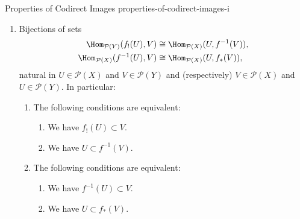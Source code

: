 \begin{proposition}{Properties of Codirect Images \rmI}{properties-of-codirect-images-i}
\begin{enumerate}
\begin{enumerate}
\begin{itemize}
                        \item For each $U\in\mathcal{P}(X)$, we have $f^{-1}(f_{*}(U))\subset U$.
                        \item For each $V\in\mathcal{P}(Y)$, we have $f_{!}(f^{-1}(V))\subset V$.
                        \item For each $V\in\mathcal{P}(Y)$, we have $V\subset f_{*}(f^{-1}(V))$.
                    \end{itemize}
                \item\label{properties-of-codirect-images-i-triple-adjointness-2}Bijections of sets
                    \begin{align*}
                        \Hom_{\mathcal{P}(Y)}(f_{!}(U),V)  &\cong \Hom_{\mathcal{P}(X)}(U,f^{-1}(V)),\\
                        \Hom_{\mathcal{P}(X)}(f^{-1}(U),V) &\cong \Hom_{\mathcal{P}(X)}(U,f_{*}(V)),
                    \end{align*}
                    natural in $U\in\mathcal{P}(X)$ and $V\in\mathcal{P}(Y)$ and (respectively) $V\in\mathcal{P}(X)$ and $U\in\mathcal{P}(Y)$. In particular:
                    \begin{enumerate}
                        \item\label{properties-of-codirect-images-i-triple-adjointness-2-a}The following conditions are equivalent:
                            \begin{enumerate}
                                \item\label{properties-of-codirect-images-i-triple-adjointness-2-a-i}We have $f_{!}(U)\subset V$.
                                \item\label{properties-of-codirect-images-i-triple-adjointness-2-a-ii}We have $U\subset f^{-1}(V)$.
                            \end{enumerate}
                        \item\label{properties-of-codirect-images-i-triple-adjointness-2-b}The following conditions are equivalent:
                            \begin{enumerate}
                                \item\label{properties-of-codirect-images-i-triple-adjointness-2-b-i}We have $f^{-1}(U)\subset V$.
                                \item\label{properties-of-codirect-images-i-triple-adjointness-2-b-ii}We have $U\subset f_{*}(V)$.
                            \end{enumerate}

\end{enumerate}
\end{enumerate}
\end{enumerate}
\end{proposition}
